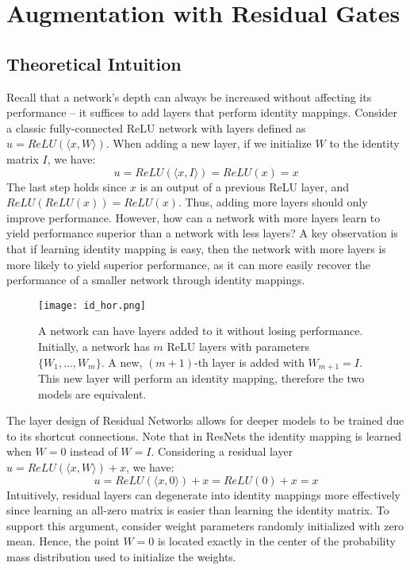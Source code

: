 \documentclass{article} %
\begin{document}
\section{Augmentation with Residual Gates}

\subsection{Theoretical Intuition}

Recall that a network's depth can always be increased without affecting its performance -- it suffices to add layers that perform identity mappings. Consider a classic fully-connected ReLU network with layers defined as $u = ReLU( \langle x,W \rangle )$. When adding a new layer, if we initialize $W$ to the identity matrix $I$, we have:
\begin{equation*}
	u = ReLU(\langle x, I \rangle) = ReLU(x) = x
\end{equation*}
The last step holds since $x$ is an output of a previous ReLU layer, and $ReLU(ReLU(x)) = ReLU(x)$. Thus, adding more layers should only improve performance. However, how can a network with more layers learn to yield performance superior than a network with less layers? A key observation is that if learning identity mapping is easy, then the network with more layers is more likely to yield superior performance, as it can more easily recover the performance of a smaller network through identity mappings. 



\begin{figure}[!ht]
  \centering
    \texttt{[image: id\_hor.png]}
  \caption{A network can have layers added to it without losing performance. Initially, a network has $m$ ReLU layers with parameters $\{W_1, \dots, W_m \}$. A new, $(m+1)$-th layer is added with $W_{m+1} = I$. This new layer will perform an identity mapping, therefore the two models are equivalent.}
\label{id}
\end{figure}


The layer design of Residual Networks allows for deeper models to be trained due to its shortcut connections. Note that in ResNets the identity mapping is learned when $W = 0$ instead of $W = I$. Considering a residual layer $u = ReLU( \langle x,W \rangle ) + x$, we have:
\begin{equation*}
	u = ReLU(\langle x, 0 \rangle) + x = ReLU(0) + x = x
\end{equation*}
Intuitively, residual layers can degenerate into identity mappings more effectively since learning an all-zero matrix is easier than learning the identity matrix. To support this argument, consider weight parameters randomly initialized with zero mean. Hence, the point $W = 0$ is located exactly in the center of the probability mass distribution used to initialize the weights.
\end{document}
